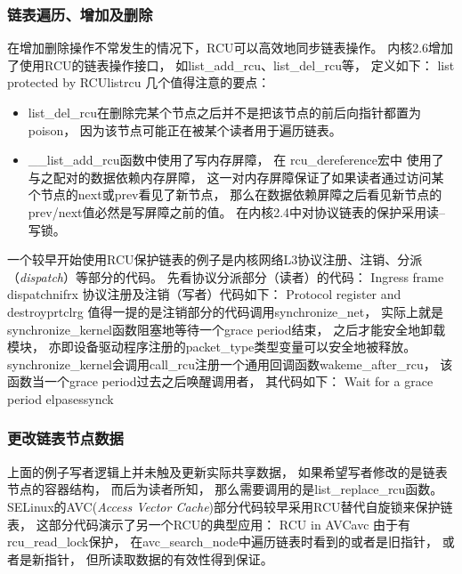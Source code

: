 \subsubsection{链表遍历、增加及删除}
在增加删除操作不常发生的情况下，RCU可以高效地同步链表操作。
内核2.6增加了使用RCU的链表操作接口，
如list\_add\_rcu、list\_del\_rcu等，
定义如下：
              {list protected by RCU}{listrcu}
几个值得注意的要点：
\begin{itemize}
\item list\_del\_rcu在删除完某个节点之后并不是把该节点的前后向指针都置为poison，
  因为该节点可能正在被某个读者用于遍历链表。
\item \_\_list\_add\_rcu函数中使用了写内存屏障，
  在%
  rcu\_dereference宏中%
  使用了与之配对的数据依赖内存屏障，
  这一对内存屏障保证了如果读者通过访问某个节点的next或prev看见了新节点，
  那么在数据依赖屏障之后看见新节点的prev/next值必然是写屏障之前的值。
  在内核2.4中对协议链表的保护采用读--写锁。
\end{itemize}

一个较早开始使用RCU保护链表的例子是内核网络L3协议注册、注销、分派%
（{\em dispatch}）等部分的代码。
先看协议分派部分（读者）的代码：
              {Ingress frame dispatch}{nifrx}
协议注册及注销（写者）代码如下：
              {Protocol register and destroy}{prtclrg}
值得一提的是注销部分的代码调用synchronize\_net，
实际上就是synchronize\_kernel函数阻塞地等待一个grace period结束，
之后才能安全地卸载模块，
亦即设备驱动程序注册的packet\_type类型变量可以安全地被释放。
synchronize\_kernel会调用call\_rcu注册一个通用回调函数wakeme\_after\_rcu，
该函数当一个grace period过去之后唤醒调用者，
其代码如下：
              {Wait for a grace period elpases}{synck}

\subsubsection{更改链表节点数据}
上面的例子写者逻辑上并未触及更新实际共享数据，
如果希望写者修改的是链表节点的容器结构，
而后为读者所知，
那么需要调用的是list\_replace\_rcu函数。
SELinux的AVC({\em Access Vector Cache})部分代码较早采用RCU替代自旋锁来保护链表，
这部分代码演示了另一个RCU的典型应用：
              {RCU in AVC}{avc}
由于有rcu\_read\_lock保护，
在avc\_search\_node中遍历链表时看到的或者是旧指针，
或者是新指针，
但所读取数据的有效性得到保证。

